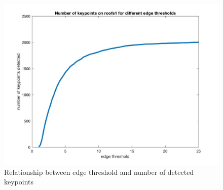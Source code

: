 \begin{figure}[!hbt]
  \includegraphics[width=\textwidth]{img/n_edge_thresh}
  \caption{Relationship between edge threshold and number of detected keypoints}
  \label{fig:n_peak_thresh}
\end{figure}

